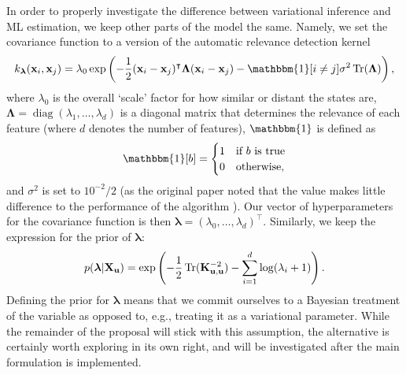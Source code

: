 \documentclass{mprop}
\theoremstyle{definition}
\DeclareMathOperator{\Tr}{Tr}
\DeclareMathOperator{\diag}{diag}
\begin{document}
In order to properly investigate the difference between variational inference
and ML estimation, we keep other parts of the model the same.
Namely, we set the covariance function to a version of the automatic relevance
detection kernel \cite{DBLP:conf/nips/LevinePK11,neal2012bayesian}
\[ k_{\bm\lambda}(\mathbf{x}_i, \mathbf{x}_j) = \lambda_0\exp\left(
    -\frac{1}{2}(\mathbf{x}_i - \mathbf{x}_j)^\intercal\bm\Lambda(\mathbf{x}_i -
    \mathbf{x}_j) - \mathbbm{1}[i \ne j]\sigma^2\Tr(\bm\Lambda) \right), \]
where $\lambda_0$ is the overall `scale' factor for how similar or distant the
states are, $\bm\Lambda = \diag(\lambda_1, \dots, \lambda_d)$ is a diagonal
matrix that determines the relevance of each feature (where $d$ denotes the
number of features), $\mathbbm{1}$ is defined as
\[ \mathbbm{1}[b] = \begin{cases}
    1 & \mbox{if $b$ is true} \\
    0 & \mbox{otherwise},
  \end{cases} \]
and $\sigma^2$ is set to $10^{-2}/2$ (as the original paper noted that
the value makes little difference to the performance of the algorithm
\cite{DBLP:conf/nips/LevinePK11}). Our vector of hyperparameters for the
covariance function is then $\bm\lambda = (\lambda_0, \dots,
\lambda_d)^\intercal$. Similarly, we keep the expression for the prior of
$\bm\lambda$:
\begin{equation} \label{eq:theta_prior}
  p(\bm\lambda | \mathbf{X_u}) = \exp\left( -\frac{1}{2}\Tr(\Kuu^{-2}) -
    \sum_{i=1}^d \log(\lambda_i + 1) \right).
\end{equation}
Defining the prior for $\bm\lambda$ means that we commit ourselves to
a Bayesian treatment of the variable as opposed to, e.g., treating it as a
variational parameter. While the remainder of the proposal will stick with this
assumption, the alternative is certainly worth exploring in its own right, and
will be investigated after the main formulation is implemented.
\end{document}
